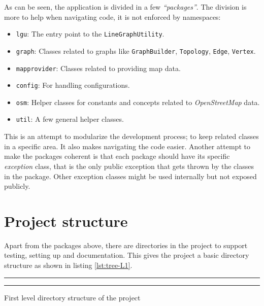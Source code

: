 \documentclass[../main.tex]{subfiles}
\begin{document}
\vspace{1em}
\noindent

As can be seen, the application is divided in a few \textit{``packages''}. The division is more to help when navigating code, it is not enforced by namespaces:

\begin{itemize}
    \item \texttt{lgu}: The entry point to the \texttt{LineGraphUtility}.
    \item \texttt{graph}: Classes related to graphs like \texttt{GraphBuilder}, \texttt{Topology}, \texttt{Edge}, \texttt{Vertex}.
    \item \texttt{mapprovider}: Classes related to providing map data.
    \item \texttt{config}: For handling configurations.
    \item \texttt{osm}: Helper classes for constants and concepts related to \textit{OpenStreetMap} data.
    \item \texttt{util}: A few general helper classes.
\end{itemize}

This is an attempt to modularize the development process; to keep related classes in a specific area. It also makes navigating the code easier. Another attempt to make the packages coherent is that each package should have its specific \textit{exception} class, that is the only public exception that gets thrown by the classes in the package. Other exception classes might be used internally but not exposed publicly.

\section{Project structure}
Apart from the packages above, there are directories in the project to support testing, setting up and documentation. This gives the project a basic directory structure as shown in listing \ref{lst:tree-L1}.

\begin{mylisting}
\hrule
\vspace{0.5em}
\vspace{0.5em}
\hrule
\vspace{0.5em}
\caption{First level directory structure of the project}
\label{lst:tree-L1}
\end{mylisting}
\end{document}
